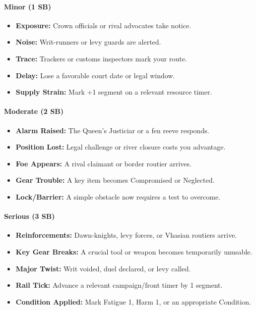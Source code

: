 \begin{itemize}[nosep]
\paragraph{Minor (1 SB)}
\begin{itemize}[nosep]
  \item \textbf{Exposure:} Crown officials or rival advocates take notice.
  \item \textbf{Noise:} Writ-runners or levy guards are alerted.
  \item \textbf{Trace:} Trackers or customs inspectors mark your route.
  \item \textbf{Delay:} Lose a favorable court date or legal window.
  \item \textbf{Supply Strain:} Mark +1 segment on a relevant resource timer.
\end{itemize}

\paragraph{Moderate (2 SB)}
\begin{itemize}[nosep]
  \item \textbf{Alarm Raised:} The Queen's Justiciar or a fen reeve responds.
  \item \textbf{Position Lost:} Legal challenge or river closure costs you advantage.
  \item \textbf{Foe Appears:} A rival claimant or border routier arrives.
  \item \textbf{Gear Trouble:} A key item becomes Compromised or Neglected.
  \item \textbf{Lock/Barrier:} A simple obstacle now requires a test to overcome.
\end{itemize}

\paragraph{Serious (3 SB)}
\begin{itemize}[nosep]
  \item \textbf{Reinforcements:} Dawn-knights, levy forces, or Vhasian routiers arrive.
  \item \textbf{Key Gear Breaks:} A crucial tool or weapon becomes temporarily unusable.
  \item \textbf{Major Twist:} Writ voided, duel declared, or levy called.
  \item \textbf{Rail Tick:} Advance a relevant campaign/front timer by 1 segment.
  \item \textbf{Condition Applied:} Mark Fatigue 1, Harm 1, or an appropriate Condition.
\end{itemize}


\end{itemize}
